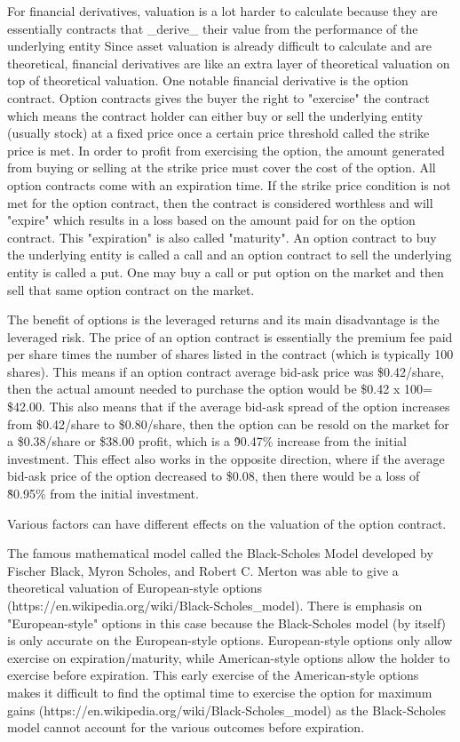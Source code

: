 \documentclass[12pt, letterpaper]{article}
\begin{document}
For financial derivatives, valuation is a lot harder to calculate because they are essentially contracts that \_derive\_ their value from the performance of the underlying entity %
Since asset valuation is already difficult to calculate and are theoretical, financial derivatives are like an extra layer of theoretical valuation on top of theoretical valuation.
One notable financial derivative is the option contract. 
Option contracts gives the buyer the right to "exercise" the contract which means the contract holder can either buy or sell the underlying entity (usually stock) at a fixed price once a certain price threshold called the strike price is met.
In order to profit from exercising the option, the amount generated from buying or selling at the strike price must cover the cost of the option.
All option contracts come with an expiration time.
If the strike price condition is not met for the option contract, then the contract is considered worthless and will "expire" which results in a loss based on the amount paid for on the option contract.
This "expiration" is also called "maturity".
An option contract to buy the underlying entity is called a call and an option contract to sell the underlying entity is called a put.
One may buy a call or put option on the market and then sell that same option contract on the market.

The benefit of options is the leveraged returns and its main disadvantage is the leveraged risk.
The price of an option contract is essentially the premium fee paid per share times the number of shares listed in the contract (which is typically 100 shares).
This means if an option contract average bid-ask price was \$0.42/share, then the actual amount needed to purchase the option would be \$0.42 x 100= \$42.00.
This also means that if the average bid-ask spread of the option increases from \$0.42/share to \$0.80/share, then the option can be resold on the market for a \$0.38/share or \$38.00 profit, which is a \~90.47\% increase from the initial investment.
This effect also works in the opposite direction, where if the average bid-ask price of the option decreased to \$0.08, then there would be a loss of \~80.95\% from the initial investment.

Various factors can have different effects on the valuation of the option contract. 

The famous mathematical model called the Black-Scholes Model developed by Fischer Black, Myron Scholes, and Robert C. Merton was able to give a theoretical valuation of European-style options (https://en.wikipedia.org/wiki/Black-Scholes\_model).
There is emphasis on "European-style" options in this case because the Black-Scholes model (by itself) is only accurate on the European-style options.
European-style options only allow exercise on expiration/maturity, while American-style options allow the holder to exercise before expiration.
This early exercise of the American-style options makes it difficult to find the optimal time to exercise the option for maximum gains (https://en.wikipedia.org/wiki/Black-Scholes\_model) as the Black-Scholes model cannot account for the various outcomes before expiration. 
\end{document}
